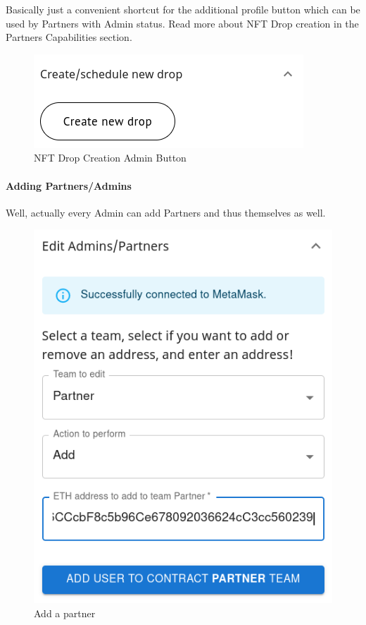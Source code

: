 \documentclass[
]{article}
\begin{document}
Basically just a convenient shortcut for the additional profile button
which can be used by Partners with Admin status. Read more about NFT
Drop creation in the Partners Capabilities section.

\begin{figure}
\centering
\includegraphics{images/drop_creation_admin_button.png}
\caption{NFT Drop Creation Admin Button}
\end{figure}

\hypertarget{adding-partnersadmins}{%
\paragraph{Adding Partners/Admins}\label{adding-partnersadmins}}

Well, actually every Admin can add Partners and thus themselves as well.

\begin{figure}
\centering
\includegraphics{images/Add_partner.png}
\caption{Add a partner}
\end{figure}\newpage
\end{document}
